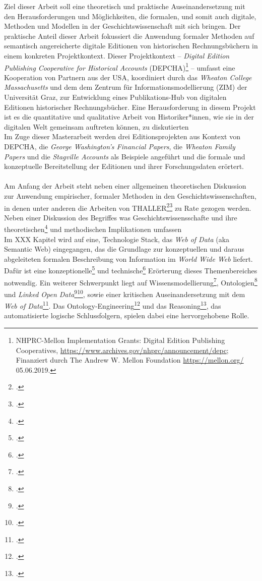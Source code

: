 \documentclass[12pt,a4paper]{article}
\begin{document}
Ziel dieser Arbeit soll eine theoretisch und praktische Auseinandersetzung mit den Herausforderungen und Möglichkeiten, die formalen, und somit auch digitale, Methoden und Modellen in der Geschichtswissenschaft mit sich bringen. Der praktische Anteil dieser Arbeit fokussiert die Anwendung formaler Methoden auf semantisch angereicherte digitale Editionen von historischen Rechnungsbüchern in einem konkreten Projektkontext. Dieser Projektkontext -- \textit{Digital Edition Publishing Cooperative for Historical Accounts} (DEPCHA)\footnote{NHPRC-Mellon Implementation Grants: Digital Edition Publishing Cooperatives, \url{https://www.archives.gov/nhprc/announcement/depc}; Finanziert durch The Andrew W. Mellon Foundation \url{https://mellon.org/} 05.06.2019.} -- umfasst eine Kooperation von Partnern aus der USA, koordiniert durch das \textit{Wheaton College Massachusetts} und dem dem Zentrum für Informationsmodellierung (ZIM) der Universität Graz, zur Entwicklung eines Publikations-Hub von digitalen Editionen historischer Rechnungsbücher. Eine Herausforderung in diesem Projekt ist es die quantitative und qualitative Arbeit von Historiker*innen, wie sie in der digitalen Welt gemeinsam auftreten können, zu diskutierten
\\
Im Zuge dieser Masterarbeit werden drei Editionsprojekten aus Kontext von DEPCHA, die \textit{George Washington’s Financial Papers}, die \textit{Wheaton Family Papers} und die \textit{Stagville Accounts} als Beispiele angeführt und die formale und konzeptuelle Bereitstellung der Editionen und ihrer Forschungsdaten erörtert.
\\
\\
Am Anfang der Arbeit steht neben einer allgemeinen theoretischen Diskussion zur Anwendung empirischer, formaler Methoden in den Geschichtswissenschaften, in denen unter anderen die Arbeiten von THALLER\footcite{thaller2017digital}\footcite{thaller2017ungefahre} zu Rate gezogen werden. Neben einer Diskussion des Begriffes was Geschichtswissensschafte und ihre theoretischen\footcite{stachowiak1973allgemeine} und methodischen Implikationen umfassen 
\\
Im XXX Kapitel wird auf eine, Technologie Stack, das \textit{Web of Data} (aka Semantic Web) eingegangen, das die Grundlage zur konzeptuellen und daraus abgeleiteten formalen Beschreibung von Information im \textit{World Wide Web} liefert. Dafür ist eine konzeptionelle\footcite{berners2001semantic} und technische\footcite{bernstein2016new} Erörterung dieses Themenbereiches notwendig. Ein weiterer Schwerpunkt liegt auf Wissensmodellierung\footcite{kelly2016practical}, Ontologien\footcite{stuckenschmidt2009ontologien} und \textit{Linked Open Data}\footcite{rietveld2015linked}\footcite{bauer2011linked}, sowie einer kritischen Auseinandersetzung mit dem \textit{Web of Data}\footcite{swartz2013aaron}. Das Ontology-Engineering\footcite{hitzler2016ontology} und das Reasoning\footcite{bursztyn2015reasoning}, das automatisierte logische Schlussfolgern, spielen dabei eine hervorgehobene Rolle.
\end{document}
